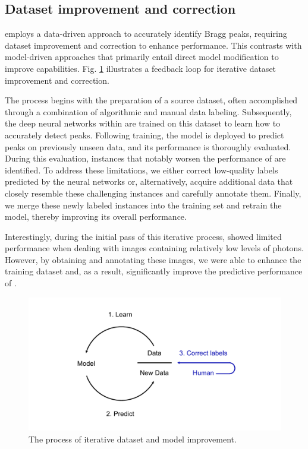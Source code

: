 \documentclass[a4paper]{article}
\begin{document}
\subsection{Dataset improvement and correction}

\peaknet{} employs a data-driven approach to accurately identify Bragg peaks, requiring dataset improvement and correction to enhance performance.  This contrasts with model-driven approaches that primarily entail direct model modification to improve capabilities.  Fig. \ref{fig : data engine} illustrates a feedback loop for iterative dataset improvement and correction.  

The process begins with the preparation of a source dataset, often accomplished through a combination of algorithmic and manual data labeling.  Subsequently, the deep neural networks within \peaknet{} are trained on this dataset to learn how to accurately detect peaks.  Following training, the model is deployed to predict peaks on previously unseen data, and its performance is thoroughly evaluated.  During this evaluation, instances that notably worsen the performance of \peaknet{} are identified.  To address these limitations, we either correct low-quality labels predicted by the neural networks or, alternatively, acquire additional data that closely resemble these challenging instances and carefully annotate them.  Finally, we merge these newly labeled instances into the training set and retrain the model, thereby improving its overall performance.  

Interestingly, during the initial pass of this iterative process, \peaknet{} showed limited performance when dealing with images containing relatively low levels of photons.  However, by obtaining and annotating these images, we were able to enhance the training dataset and, as a result, significantly improve the predictive performance of \peaknet{}.


\begin{figure}[!ht]
\centering
\includegraphics[width=\columnwidth,keepaspectratio,trim={1in 0in 1in 0in}]
{./figures/data_engine.pdf}
\caption{The process of iterative dataset and model improvement.}
\label{fig : data engine}
\end{figure}
\end{document}

